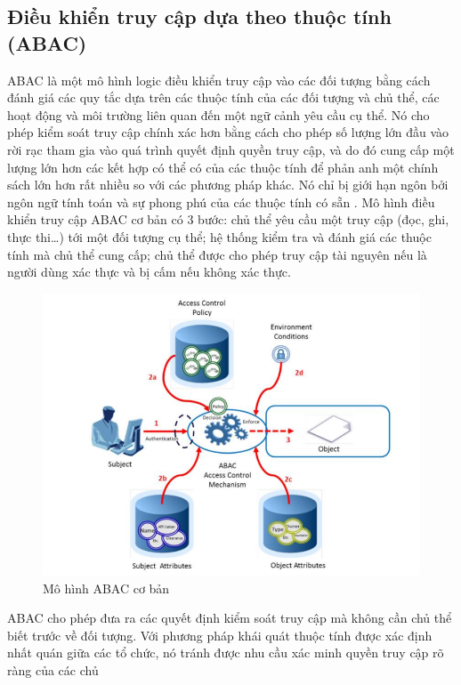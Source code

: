 \subsection{Điều khiển truy cập dựa theo thuộc tính (ABAC)}
ABAC là một mô hình logic điều khiển truy cập vào các đối tượng bằng cách
đánh giá các quy tắc dựa trên các thuộc tính của các đối tượng và chủ thể, các hoạt động
và môi trường liên quan đến một ngữ cảnh yêu cầu cụ thể. Nó cho phép kiểm soát truy
cập chính xác hơn bằng cách cho phép số lượng lớn đầu vào rời rạc tham gia vào quá
trình quyết định quyền truy cập, và do đó cung cấp một lượng lớn hơn các kết hợp có
thể có của các thuộc tính để phản anh một chính sách lớn hơn rất nhiều so với các phương
pháp khác. Nó chỉ bị giới hạn ngôn bởi ngôn ngữ tính toán và sự phong phú của các
thuộc tính có sẵn \cite{hu2015attribute}. 
\indent Mô hình điều khiển truy cập ABAC cơ bản có 3 bước: chủ thể yêu cầu một truy
cập (đọc, ghi, thực thi…) tới một đối tượng cụ thể; hệ thống kiểm tra và đánh giá các
thuộc tính mà chủ thể cung cấp; chủ thể được cho phép truy cập tài nguyên nếu là người
dùng xác thực và bị cấm nếu không xác thực. 
\begin{figure}
    \centering
    \includegraphics[scale=0.5]{graphics/chapter-2/chap2-basic-abac.png}
    \caption{Mô hình ABAC cơ bản \cite{hu2013guide}}
    \label{fig:chap2-basic-abac}
\end{figure} 
\indent ABAC cho phép đưa ra các quyết định kiểm soát truy cập mà không cần chủ thể
biết trước về đối tượng. Với phương pháp khái quát thuộc tính được xác định nhất quán
giữa các tổ chức, nó tránh được nhu cầu xác minh quyền truy cập rõ ràng của các chủ
